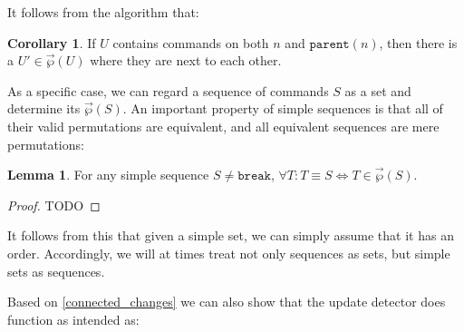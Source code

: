 \documentclass[12pt]{article}
\newcommand{\parent}{\mathtt{parent}}
\newcommand{\cbrk}{\mathtt{break}} %
\newcommand{\orderset}[1]{\vec{\wp}({#1})}
\theoremstyle{definition}
\newtheorem{mylem}{Lemma}
\newtheorem{mycor}{Corollary}
\begin{document}
It follows from the algorithm that:
\begin{mycor}\label{lemma:neighbor}
If $U$ contains commands on both $n$ and $\parent(n)$, then
there is a $U'\in\orderset{U}$ where they are next to each other.
\end{mycor}

As a specific case, we can regard a sequence of commands $S$
as a set and determine its $\orderset{S}$.
An important property of simple sequences is that
all of their valid permutations are equivalent,
and all equivalent sequences are mere permutations:

\begin{mylem}\label{simple_reorder_equiv}
For any simple sequence $S\neq\cbrk$,
$\forall T: T\equiv S \Leftrightarrow T\in\orderset{S}$.
\end{mylem}
\begin{proof}
TODO
\end{proof}

It follows from this that given a simple set,
we can simply assume that it has an order.
Accordingly, we will at times treat not only sequences as sets,
but simple sets as sequences.


\medskip


Based on \cref{connected_changes} we can also show that
the update detector does function as intended as:
\end{document}
